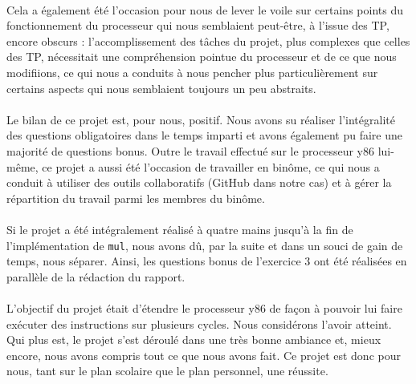 \documentclass[12pt]{article}
\begin{document}
\paragraph{}Cela a également été l'occasion pour nous de lever le voile sur certains points du fonctionnement du processeur qui nous semblaient peut-être, à l'issue des TP, encore obscurs : l'accomplissement des tâches du projet, plus complexes que celles des TP, nécessitait une compréhension pointue du processeur et de ce que nous modifiions, ce qui nous a conduits à nous pencher plus particulièrement sur certains aspects qui nous semblaient toujours un peu abstraits.

\paragraph{}Le bilan de ce projet est, pour nous, positif. Nous avons su réaliser l'intégralité des questions obligatoires dans le temps imparti et avons également pu faire une majorité de questions bonus. Outre le travail effectué sur le processeur y86 lui-même, ce projet a aussi été l'occasion de travailler en binôme, ce qui nous a conduit à utiliser des outils collaboratifs (GitHub dans notre cas) et à gérer la répartition du travail parmi les membres du binôme.

\paragraph{}Si le projet a été intégralement réalisé à quatre mains jusqu'à la fin de l'implémentation de \verb+mul+, nous avons dû, par la suite et dans un souci de gain de temps, nous séparer. Ainsi, les questions bonus de l'exercice 3 ont été réalisées en parallèle de la rédaction du rapport.

\paragraph{}L'objectif du projet était d'étendre le processeur y86 de façon à pouvoir lui faire exécuter des instructions sur plusieurs cycles. Nous considérons l'avoir atteint. Qui plus est, le projet s'est déroulé dans une très bonne ambiance et, mieux encore, nous avons compris tout ce que nous avons fait. Ce projet est donc pour nous, tant sur le plan scolaire que le plan personnel, une réussite.
\end{document}
